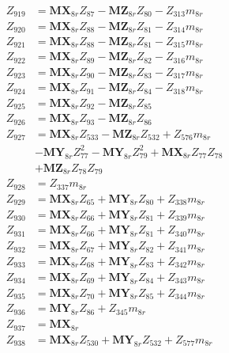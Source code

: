 \begin{multicols}{2}
\begin{align}
Z_{919} &= \mathbf{MX}_{8r}Z_{87} - \mathbf{MZ}_{8r}Z_{80} - Z_{313}m_{8r} \nonumber \\
Z_{920} &= \mathbf{MX}_{8r}Z_{88} - \mathbf{MZ}_{8r}Z_{81} - Z_{314}m_{8r} \nonumber \\
Z_{921} &= \mathbf{MX}_{8r}Z_{88} - \mathbf{MZ}_{8r}Z_{81} - Z_{315}m_{8r} \nonumber \\
Z_{922} &= \mathbf{MX}_{8r}Z_{89} - \mathbf{MZ}_{8r}Z_{82} - Z_{316}m_{8r} \nonumber \\
Z_{923} &= \mathbf{MX}_{8r}Z_{90} - \mathbf{MZ}_{8r}Z_{83} - Z_{317}m_{8r} \nonumber \\
Z_{924} &= \mathbf{MX}_{8r}Z_{91} - \mathbf{MZ}_{8r}Z_{84} - Z_{318}m_{8r} \nonumber \\
Z_{925} &= \mathbf{MX}_{8r}Z_{92} - \mathbf{MZ}_{8r}Z_{85} \nonumber \\
Z_{926} &= \mathbf{MX}_{8r}Z_{93} - \mathbf{MZ}_{8r}Z_{86} \nonumber \\
Z_{927} &= \mathbf{MX}_{8r}Z_{533} - \mathbf{MZ}_{8r}Z_{532} + Z_{576}m_{8r}  \nonumber \\
&- \mathbf{MY}_{8r}Z_{77}^2 - \mathbf{MY}_{8r}Z_{79}^2 + \mathbf{MX}_{8r}Z_{77}Z_{78}  \nonumber \\
&+ \mathbf{MZ}_{8r}Z_{78}Z_{79} \nonumber \\
Z_{928} &= Z_{337}m_{8r} \nonumber \\
Z_{929} &= \mathbf{MX}_{8r}Z_{65} + \mathbf{MY}_{8r}Z_{80} + Z_{338}m_{8r} \nonumber \\
Z_{930} &= \mathbf{MX}_{8r}Z_{66} + \mathbf{MY}_{8r}Z_{81} + Z_{339}m_{8r} \nonumber \\
Z_{931} &= \mathbf{MX}_{8r}Z_{66} + \mathbf{MY}_{8r}Z_{81} + Z_{340}m_{8r} \nonumber \\
Z_{932} &= \mathbf{MX}_{8r}Z_{67} + \mathbf{MY}_{8r}Z_{82} + Z_{341}m_{8r} \nonumber \\
Z_{933} &= \mathbf{MX}_{8r}Z_{68} + \mathbf{MY}_{8r}Z_{83} + Z_{342}m_{8r} \nonumber \\
Z_{934} &= \mathbf{MX}_{8r}Z_{69} + \mathbf{MY}_{8r}Z_{84} + Z_{343}m_{8r} \nonumber \\
Z_{935} &= \mathbf{MX}_{8r}Z_{70} + \mathbf{MY}_{8r}Z_{85} + Z_{344}m_{8r} \nonumber \\
Z_{936} &= \mathbf{MY}_{8r}Z_{86} + Z_{345}m_{8r} \nonumber \\
Z_{937} &= \mathbf{MX}_{8r} \nonumber \\
Z_{938} &= \mathbf{MX}_{8r}Z_{530} + \mathbf{MY}_{8r}Z_{532} + Z_{577}m_{8r}  \nonumber \\

\end{align}
\end{multicols}
